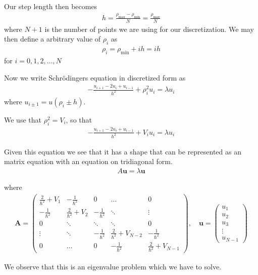 \documentclass[11pt, a4paper]{article}
\begin{document}
Our step length then becomes 
\begin{gather}
h = \frac{\rho_\text{max}-\rho_\text{min}}{N} = \frac{\rho_\text{max}}{N}
\end{gather}
where $N+1$ is the number of points we are using for our discretization. 
We may then define a arbitrary value of $\rho_i$ as 
\begin{gather}
\rho_i = \rho_\text{min} + ih = ih
\end{gather}
for $i=0,1,2,\dots,N$

Now we write Schr\"odingers equation in discretized form as
\begin{gather}
-\frac{u_{i+1} -2u_i +u_{i-1}}{h^2}+\rho_i^2u_i=\lambda u_i
\end{gather}
where $u_{i\pm1} = u(\rho_i \pm h)$.

We use that $\rho_i^2=V_i$, so that 
\begin{gather}
-\frac{u_{i+1} -2u_i +u_{i-1}}{h^2}+V_iu_i=\lambda u_i
\end{gather}

Given this equation we see that it has a shape that can be represented as an matrix equation with an equation on tridiagonal form.
\begin{gather}
A\mathbf{u}=\lambda\mathbf{u}
\label{eigequ}
\end{gather}

where
\begin{gather}
\mathbf{A} = 
\begin{pmatrix}
\frac{2}{\hbar^2} + V_1& -\frac{1}{\hbar^2} & 0 & \dots & 0\\
-\frac{1}{\hbar^2} & \frac{2}{\hbar^2} + V_2& -\frac{1}{\hbar^2} & \ddots & \vdots \\
0 & \ddots & \ddots & \ddots & 0\\
\vdots & \ddots & -\frac{1}{\hbar^2} & \frac{2}{\hbar^2} + V_{N-2} & -\frac{1}{\hbar^2}\\
0 & \dots & 0 & -\frac{1}{\hbar^2} &\frac{2}{\hbar^2} + V_{N-1}
\end{pmatrix},
\quad
\mathbf{u} =
\begin{pmatrix}
u_1\\
u_2\\
u_3\\
\vdots\\
u_{N-1}
\end{pmatrix}
\end{gather}

We observe that this is an eigenvalue problem which we have to solve. 
\end{document}
